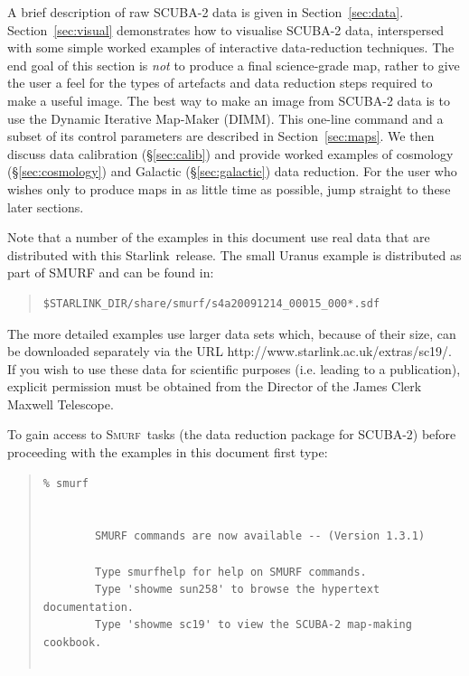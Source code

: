 \documentclass[twoside,11pt]{article}
\newcommand{\htmladdnormallink}[2]{#1}
\newcommand{\xref}[3]{#1}
\renewcommand{\_}{\texttt{\symbol{95}}}
\newenvironment{myquote}{\begin{quote}\begin{small}}{\end{small}\end{quote}}
\newcommand{\starlink}{\htmladdnormallink{Starlink}{http://starlink.jach.hawaii.edu}}
\newcommand{\smurf}{\xref{\textsc{Smurf}}{sun258}{}}
\begin{document}
A brief description of raw SCUBA-2 data is given in
Section~\ref{sec:data}. Section~\ref{sec:visual} demonstrates how to
visualise SCUBA-2 data, interspersed with some simple worked examples
of interactive data-reduction techniques. The end goal of this section
is {\em not} to produce a final science-grade map, rather to give the
user a feel for the types of artefacts and data reduction steps
required to make a useful image. The best way to make an image from
SCUBA-2 data is to use the Dynamic Iterative Map-Maker (DIMM). This
one-line command and a subset of its control parameters are described
in Section~\ref{sec:maps}. We then discuss data calibration
(\S\ref{sec:calib}) and provide worked examples of cosmology
(\S\ref{sec:cosmology}) and Galactic (\S\ref{sec:galactic}) data
reduction. For the user who wishes only to produce maps in as little
time as possible, jump straight to these later sections.

Note that a number of the examples in this document use real data that
are distributed with this \starlink\ release. The small Uranus example
is distributed as part of SMURF and can be found in:

\begin{myquote}
\begin{verbatim}
$STARLINK_DIR/share/smurf/s4a20091214_00015_000*.sdf
\end{verbatim}
\end{myquote}

The more detailed examples use larger data sets which, because of
their size, can be downloaded separately via the URL
\htmladdnormallink{http://www.starlink.ac.uk/extras/sc19/}{http://www.starlink.ac.uk/extras/sc19/}.
If you wish to use these data for scientific purposes (i.e. leading to
a publication), explicit permission must be obtained from the Director
of the James Clerk Maxwell Telescope.

To gain access to \smurf\ tasks (the data reduction package for
SCUBA-2) before proceeding with the examples in this document first
type:

\begin{myquote}
\begin{verbatim}
% smurf


        SMURF commands are now available -- (Version 1.3.1)

        Type smurfhelp for help on SMURF commands.
        Type 'showme sun258' to browse the hypertext documentation.
        Type 'showme sc19' to view the SCUBA-2 map-making cookbook.


\end{verbatim}
\end{myquote}
%
\end{document}
